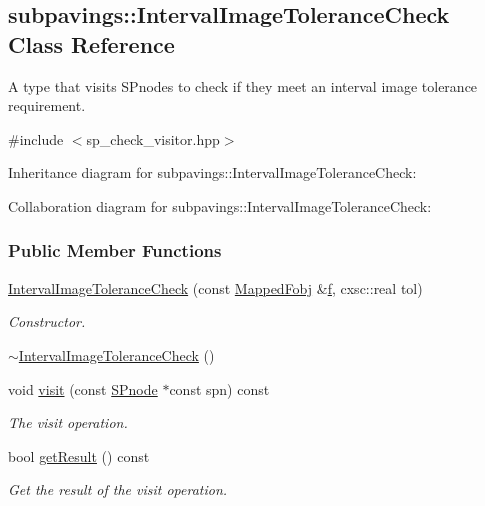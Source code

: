 \hypertarget{classsubpavings_1_1IntervalImageToleranceCheck}{\subsection{subpavings\-:\-:\-Interval\-Image\-Tolerance\-Check \-Class \-Reference}
\label{classsubpavings_1_1IntervalImageToleranceCheck}
}


\-A type that visits  \-S\-Pnodes to check if they meet an interval image tolerance requirement.  




{\ttfamily \#include $<$sp\-\_\-check\-\_\-visitor.\-hpp$>$}



\-Inheritance diagram for subpavings\-:\-:\-Interval\-Image\-Tolerance\-Check\-:


\-Collaboration diagram for subpavings\-:\-:\-Interval\-Image\-Tolerance\-Check\-:
\subsubsection*{\-Public \-Member \-Functions}
\begin{DoxyCompactItemize}
\item 
\hyperlink{classsubpavings_1_1IntervalImageToleranceCheck_a146b5b117b9b071a9bafafc7a9d23766}{\-Interval\-Image\-Tolerance\-Check} (const \hyperlink{classsubpavings_1_1MappedFobj}{\-Mapped\-Fobj} \&\hyperlink{errorfunc_8hpp_aacb77b1211a6ca2e2beff1811cf9ecf4}{f}, cxsc\-::real tol)
\begin{DoxyCompactList}\small\item\em \-Constructor. \end{DoxyCompactList}\item 
\hyperlink{classsubpavings_1_1IntervalImageToleranceCheck_aff7db09958c3b8f16bcfd1656bec3771}{$\sim$\-Interval\-Image\-Tolerance\-Check} ()
\item 
void \hyperlink{classsubpavings_1_1IntervalImageToleranceCheck_a47430de6c645ae717791f17425764ea4}{visit} (const \hyperlink{classsubpavings_1_1SPnode}{\-S\-Pnode} $\ast$const spn) const 
\begin{DoxyCompactList}\small\item\em \-The visit operation. \end{DoxyCompactList}\item 
bool \hyperlink{classsubpavings_1_1IntervalImageToleranceCheck_a02946bab9ff32b818f246a418b6e5b96}{get\-Result} () const 
\begin{DoxyCompactList}\small\item\em \-Get the result of the visit operation. \end{DoxyCompactList}\end{DoxyCompactItemize}
